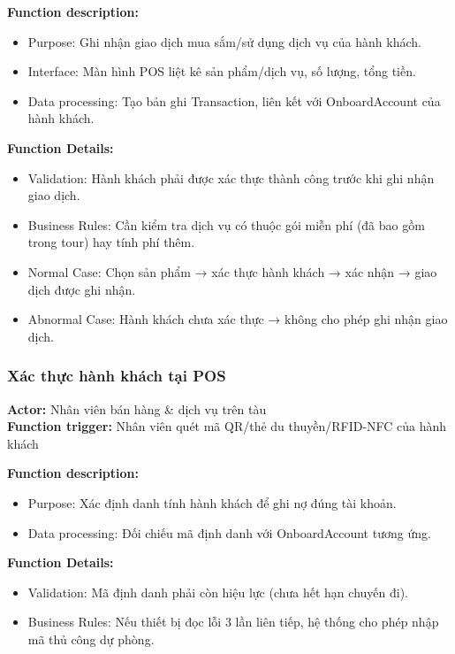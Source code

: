 \textbf{Function description:}
\begin{itemize}
    \item Purpose: Ghi nhận giao dịch mua sắm/sử dụng dịch vụ của hành
    khách.
    \item Interface: Màn hình POS liệt kê sản phẩm/dịch vụ, số lượng,
    tổng tiền.
    \item Data processing: Tạo bản ghi Transaction, liên kết với
    OnboardAccount của hành khách.
\end{itemize}

\textbf{Function Details:}
\begin{itemize}
    \item Validation: Hành khách phải được xác thực thành công trước khi
    ghi nhận giao dịch.
    \item Business Rules: Cần kiểm tra dịch vụ có thuộc gói miễn phí (đã
    bao gồm trong tour) hay tính phí thêm.
    \item Normal Case: Chọn sản phẩm → xác thực hành khách → xác nhận →
    giao dịch được ghi nhận.
    \item Abnormal Case: Hành khách chưa xác thực → không cho phép ghi
    nhận giao dịch.
\end{itemize}



\subsubsection{Xác thực hành khách tại POS}
\textbf{Actor:} Nhân viên bán hàng \& dịch vụ trên tàu \\
\textbf{Function trigger:} Nhân viên quét mã QR/thẻ du thuyền/RFID-NFC
của hành khách

\textbf{Function description:}
\begin{itemize}
    \item Purpose: Xác định danh tính hành khách để ghi nợ đúng tài
    khoản.
    \item Data processing: Đối chiếu mã định danh với OnboardAccount
    tương ứng.
\end{itemize}

\textbf{Function Details:}
\begin{itemize}
    \item Validation: Mã định danh phải còn hiệu lực (chưa hết hạn chuyến
    đi).
    \item Business Rules: Nếu thiết bị đọc lỗi 3 lần liên tiếp, hệ thống
    cho phép nhập mã thủ công dự phòng.
\end{itemize}


